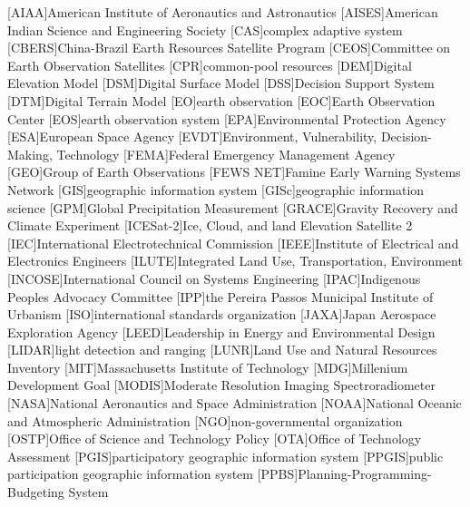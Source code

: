 \begin{acronym}[HyperLEAVES] \itemsep0pt \setlength{\parskip}{0pt}
[AIAA]{American Institute of Aeronautics and Astronautics}
[AISES]{American Indian Science and Engineering Society}
[CAS]{complex adaptive system}
[CBERS]{China-Brazil Earth Resources Satellite Program}
[CEOS]{Committee on Earth Observation Satellites}
[CPR]{common-pool resources}
[DEM]{Digital Elevation Model}
[DSM]{Digital Surface Model}
[DSS]{Decision Support System}
[DTM]{Digital Terrain Model}
[EO]{earth observation}
[EOC]{Earth Observation Center}
[EOS]{earth observation system}
[EPA]{Environmental Protection Agency}
[ESA]{European Space Agency}
[EVDT]{Environment, Vulnerability, Decision-Making, Technology}
[FEMA]{Federal Emergency Management Agency}
[GEO]{Group of Earth Observations}
[FEWS NET]{Famine Early Warning Systems Network}
[GIS]{geographic information system}
[GISc]{geographic information science}
[GPM]{Global Precipitation Measurement}
[GRACE]{Gravity Recovery and Climate Experiment}
[ICESat-2]{Ice, Cloud, and land Elevation Satellite 2}
[IEC]{International Electrotechnical Commission}
[IEEE]{Institute of Electrical and Electronics Engineers}
[ILUTE]{Integrated Land Use, Transportation, Environment}
[INCOSE]{International Council on Systems Engineering}
[IPAC]{Indigenous Peoples Advocacy Committee}
[IPP]{the Pereira Passos Municipal Institute of Urbanism}
[ISO]{international standards organization}
[JAXA]{Japan Aerospace Exploration Agency}
[LEED]{Leadership in Energy and Environmental Design}
[LIDAR]{light detection and ranging}
[LUNR]{Land Use and Natural Resources Inventory}
[MIT]{Massachusetts Institute of Technology}
[MDG]{Millenium Development Goal}
[MODIS]{Moderate Resolution Imaging Spectroradiometer}
[NASA]{National Aeronautics and Space Administration}
[NOAA]{National Oceanic and Atmospheric Administration}
[NGO]{non-governmental organization}
[OSTP]{Office of Science and Technology Policy}
[OTA]{Office of Technology Assessment}
[PGIS]{participatory geographic information system}
[PPGIS]{public participation geographic information system}
[PPBS]{Planning-Programming-Budgeting System}

\end{acronym}
